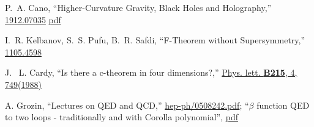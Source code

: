 \documentclass[12pt, a4paper]{article}
\numberwithin{equation}{section}
\begin{document}
\begin{thebibliography}{10}
P.~A. Cano, ``{Higher-Curvature Gravity, Black Holes and Holography},'' \href{https://arxiv.org/abs/1912.07035}{1912.07035} \href{https://arxiv.org/pdf/1912.07035.pdf}{pdf}

I.~R. Kelbanov, S.~S. Pufu, B.~R. Safdi, ``{F-Theorem without Supersymmetry},'' \href{https://arxiv.org/pdf/1105.4598.pdf}{1105.4598}

J. ~L. Cardy, ``{Is there a c-theorem in four dimensions?},'' \href{https://www.sciencedirect.com/science/article/pii/0370269388900548}{Phys. lett. \textbf{B215}, 4, 749(1988)}

A. Grozin, ``{Lectures on QED and QCD},'' \href{https://arxiv.org/pdf/hep-ph/0508242.pdf}{hep-ph/0508242.pdf}; ``{$\beta$ function QED to two loops - traditionally and with Corolla polynomial}'', \href{http://www2.mathematik.hu-berlin.de/~kreimer/wp-content/uploads/grauelm.pdf}{pdf}



\end{thebibliography}\endgroup
\end{document}
